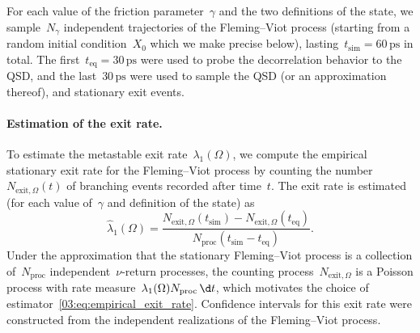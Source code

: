 For each value of the friction parameter~$\gamma$ and the two definitions of the state, we sample~$N_{\gamma}$ independent trajectories of the Fleming--Viot process (starting from a random initial condition~$X_0$ which we make precise below), lasting~$t_{\mathrm{sim}}=60\,\mathrm{ps}$ in total. The first~$t_{\mathrm{eq}}=30\,\mathrm{ps}$ were used to probe the decorrelation behavior to the QSD, and the last~$30\,\mathrm{ps}$ were used to sample the QSD (or an approximation thereof), and stationary exit events.

\paragraph{Estimation of the exit rate.}
To estimate the metastable exit rate~$\lambda_1(\Omega)$, we compute the empirical stationary exit rate for the Fleming--Viot process by counting the number~$N_{\mathrm{exit},\Omega}(t)$ of branching events recorded after time~$t$.
The exit rate is estimated (for each value of~$\gamma$ and definition of the state) as
\begin{equation}
    \label{03:eq:empirical_exit_rate}
    \widehat{\lambda}_1(\Omega) = \frac{N_{\mathrm{exit},\Omega}(t_{\mathrm{sim}})-N_{\mathrm{exit},\Omega}(t_{\mathrm{eq}})}{N_{\mathrm{proc}}\left(t_{\mathrm{sim}}-t_{\mathrm{eq}}\right)}.
\end{equation}
Under the approximation that the stationary Fleming--Viot process is a collection of~$N_{\mathrm{proc}}$ independent~$\nu$-return processes, the counting process~$N_{\mathrm{exit},\Omega}$ is a Poisson process with rate measure~$\lambda_1(\Omega)N_{\mathrm{proc}}\,\d t$, which motivates the choice of estimator~\eqref{03:eq:empirical_exit_rate}.
Confidence intervals for this exit rate were constructed from the independent realizations of the Fleming--Viot process.

